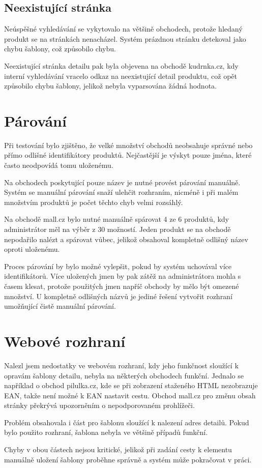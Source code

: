 \documentclass[thesis=B,czech]{FITthesis}[2012/06/26]
\begin{document}
\subsection{Neexistující stránka}
Neúspěšné vyhledávání se vykytovalo na většině obchodech, protože hledaný produkt se na stránkách nenacházel. Systém prázdnou stránku detekoval jako chybu šablony, což způsobilo chybu.
\par
Neexistující stránka detailu pak byla objevena na obchodě kudrnka.cz, kdy interní vyhledávání vracelo odkaz na neexistující detail produktu, což opět způsobilo chybu šablony, jelikož nebyla vyparsována žádná hodnota.

\section{Párování}
Při testování bylo zjištěno, že velké množství obchodů neobsahuje správné nebo přímo odlišné identifikátory produktů. Nejčastější je výskyt pouze jména, které často neodpovídá tomu uloženému.
\par
Na obchodech poskytující pouze název je nutné provést párování manuálně. Systém se manuální párování snaží ulehčit rozhraním, nicméně i při malém množstvím produktů je počet těchto chyb velmi rozsáhlý. 
\par
Na obchodě mall.cz bylo nutné manuálně spárovat 4 ze 6 produktů, kdy administrátor měl na výběr z 30 možností. Jeden produkt se na obchodě nepodařilo nalézt a spárovat vůbec, jelikož obsahoval kompletně odlišný název oproti uloženému.
\par
Proces párování by bylo možné vylepšit, pokud by systém uchovával více identifikátorů. Více uložených jmen by pak zátěž na administrátora mohla s časem klesat, protože použitých jmen napříč obchody by mělo být omezené množství.
U kompletně odlišných názvů je jediné řešení vytvořit rozhraní umožňující čistě manuální párování.

\section{Webové rozhraní}\label{ch:web-interface}
Nalezl jsem nedostatky ve webovém rozhraní, kdy jeho funkčnost sloužící k opravám šablony detailu, nebyla na některých obchodech funkční.
Jednalo se například o obchod pilulka.cz, kde se při zobrazení staženého HTML nezobrazuje EAN, takže není možné k EAN nastavit cestu. 
Obchod mall.cz pro změnu obsah stránky překrývá upozorněním o nepodporovaném prohlížeči.
\par
Problém obsahovala i část pro šablonu sloužící k nalezení adres detailů. Pokud bylo použito rozhraní, šablona nebyla ve většině
případů funkční. 
\par
Chyby v obou částech nejsou kritické, jelikož při zadání cesty k elementu manuálně uložení šablony proběhne správně a systém může pokračovat
v práci.
\end{document}
